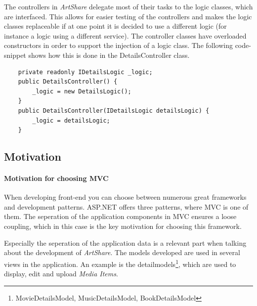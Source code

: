 \documentclass[../report.tex]{subfiles}
\begin{document}
The controllers in \textit{ArtShare} delegate most of their tasks to the logic classes, which are interfaced. This allows for easier testing of the controllers and makes the logic classes replaceable if at one point it is decided to use a different logic (for instance a logic using a different service). The controller classes have overloaded constructors in order to support the injection of a logic class. The following code-snippet shows how this is done in the DetailsController class.

\begin{lstlisting}
	private readonly IDetailsLogic _logic;
	public DetailsController() {
		_logic = new DetailsLogic();
	}
	public DetailsController(IDetailsLogic detailsLogic) {
		_logic = detailsLogic;
	}
\end{lstlisting}




\subsection{Motivation}

\paragraph{Motivation for choosing MVC}
When developing front-end you can choose between numerous great frameworks and development patterns. ASP.NET offers three patterns, where MVC is one of them. The seperation of the application components in MVC ensures a loose coupling, which in this case is the key motivation for choosing this framework.

Especially the seperation of the application data is a relevant part when talking about the development of \textit{ArtShare}. The models developed are used in several views in the application. An example is the detailmodels\footnote{MovieDetailsModel, MusicDetailsModel, BookDetailsModel}, which are used to display, edit and upload \textit{Media Items}.
\end{document}
